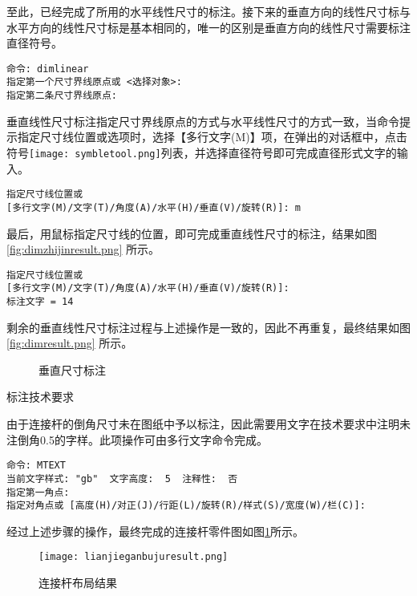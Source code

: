 \begin{procedure}
至此，已经完成了所用的水平线性尺寸的标注。接下来的垂直方向的线性尺寸标与水平方向的线性尺寸标是基本相同的，唯一的区别是垂直方向的线性尺寸需要标注直径符号。
\begin{lstlisting}
命令: dimlinear
指定第一个尺寸界线原点或 <选择对象>:
指定第二条尺寸界线原点:
\end{lstlisting}

垂直线性尺寸标注指定尺寸界线原点的方式与水平线性尺寸的方式一致，当命令提示指定尺寸线位置或选项时，选择【多行文字(M)】项，在弹出的对话框中，点击符号\texttt{[image: symbletool.png]}列表，并选择直径符号即可完成直径形式文字的输入。
\begin{lstlisting}
指定尺寸线位置或
[多行文字(M)/文字(T)/角度(A)/水平(H)/垂直(V)/旋转(R)]: m
\end{lstlisting}

最后，用鼠标指定尺寸线的位置，即可完成重直线性尺寸的标注，结果如图\ref{fig:dimzhijinresult.png} 所示。
\begin{lstlisting}
指定尺寸线位置或
[多行文字(M)/文字(T)/角度(A)/水平(H)/垂直(V)/旋转(R)]:
标注文字 = 14
\end{lstlisting}

剩余的垂直线性尺寸标注过程与上述操作是一致的，因此不再重复，最终结果如图\ref{fig:dimresult.png} 所示。

\begin{figure}[htbp]
\centering
{}\hspace{20pt}
\caption{垂直尺寸标注}
\end{figure}
\item 标注技术要求

由于连接杆的倒角尺寸未在图纸中予以标注，因此需要用文字在技术要求中注明未注倒角0.5的字样。此项操作可由多行文字命令完成。
\begin{lstlisting}
命令: MTEXT
当前文字样式: "gb"  文字高度:  5  注释性:  否
指定第一角点:
指定对角点或 [高度(H)/对正(J)/行距(L)/旋转(R)/样式(S)/宽度(W)/栏(C)]:
\end{lstlisting}
\end{procedure}

经过上述步骤的操作，最终完成的连接杆零件图如图\ref{fig:lianjieganbujuresult.png}所示。
\begin{figure}[htbp]
\centering
\texttt{[image: lianjieganbujuresult.png]}
\caption{连接杆布局结果}\label{fig:lianjieganbujuresult.png}
\end{figure}
\endinput